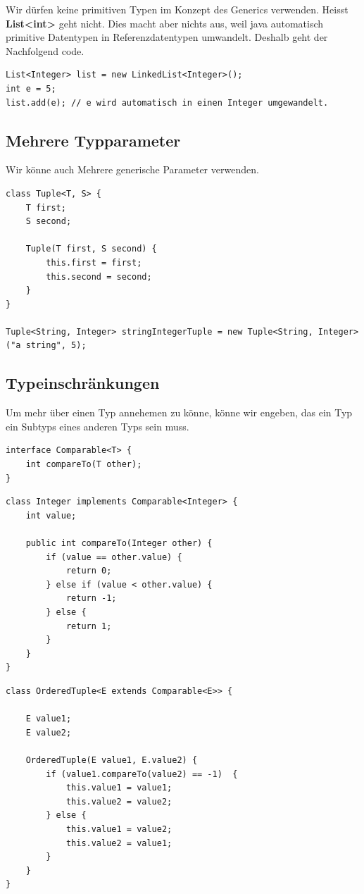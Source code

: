 \documentclass[12pt]{article}
\begin{document}
    Wir dürfen keine primitiven Typen im Konzept des Generics verwenden. Heisst \textbf{List<int>} geht nicht. Dies macht 
    aber nichts aus, weil java automatisch primitive Datentypen in Referenzdatentypen umwandelt. Deshalb geht der Nachfolgend code.

    \begin{lstlisting}
List<Integer> list = new LinkedList<Integer>();
int e = 5;
list.add(e); // e wird automatisch in einen Integer umgewandelt. 
    \end{lstlisting}

    \subsection*{Mehrere Typparameter}

    Wir könne auch Mehrere generische Parameter verwenden. 

    \begin{lstlisting}
class Tuple<T, S> {
    T first;
    S second;

    Tuple(T first, S second) {
        this.first = first;
        this.second = second;      
    }
}

Tuple<String, Integer> stringIntegerTuple = new Tuple<String, Integer>("a string", 5);
    \end{lstlisting}

    \subsection*{Typeinschränkungen}

    Um mehr über einen Typ annehemen zu könne, könne wir engeben, das ein Typ ein Subtyps eines anderen Typs sein muss. 

    \begin{lstlisting}[caption=Comparble]
interface Comparable<T> {
    int compareTo(T other);
}
    \end{lstlisting}

    \begin{lstlisting}
class Integer implements Comparable<Integer> {
    int value; 

    public int compareTo(Integer other) {
        if (value == other.value) { 
            return 0;
        } else if (value < other.value) {
            return -1;
        } else {
            return 1;
        }
    }
}
    \end{lstlisting}

    \begin{lstlisting}[caption=typeinschränkung angewendet]
class OrderedTuple<E extends Comparable<E>> {

    E value1;
    E value2;
    
    OrderedTuple(E value1, E.value2) {
        if (value1.compareTo(value2) == -1)  {
            this.value1 = value1;
            this.value2 = value2;
        } else {
            this.value1 = value2;
            this.value2 = value1;
        }
    }
}
    \end{lstlisting}
\end{document}

